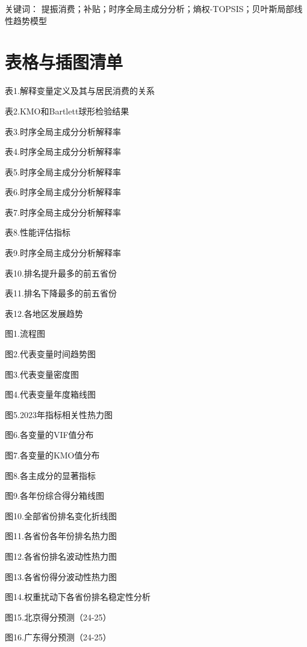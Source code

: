 \documentclass[UTF8,a4paper,zihao=-4,AutoFakeBold]{ctexart}
\begin{document}
		
		
		\heiti{}\setlength{\baselineskip}{24pt}  关键词：
		\songti{}\setlength{\baselineskip}{24pt} 提振消费；补贴；时序全局主成分分析；熵权-TOPSIS；贝叶斯局部线性趋势模型
	
	\clearpage
	\tableofcontents
	\newpage
	\clearpage
	
	\clearpage
	\section*{\centering\heiti{} 表格与插图清单} 
	表1.解释变量定义及其与居民消费的关系
	
	表2.KMO和Bartlett球形检验结果
	
	表3.时序全局主成分分析解释率
	
	表4.时序全局主成分分析解释率
	
	表5.时序全局主成分分析解释率
	
	表6.时序全局主成分分析解释率
	
	表7.时序全局主成分分析解释率
	
	表8.性能评估指标
	
	表9.时序全局主成分分析解释率
	
	表10.排名提升最多的前五省份
	
	表11.排名下降最多的前五省份
	
	表12.各地区发展趋势
	
	图1.流程图
	
	图2.代表变量时间趋势图
	
	图3.代表变量密度图
	
	图4.代表变量年度箱线图
	
	图5.2023年指标相关性热力图
	
	图6.各变量的VIF值分布
	
	图7.各变量的KMO值分布
	
	图8.各主成分的显著指标
	
	图9.各年份综合得分箱线图
	
	图10.全部省份排名变化折线图
	
	图11.各省份各年份排名热力图
	
	图12.各省份排名波动性热力图
	
	图13.各省份得分波动性热力图
	
	图14.权重扰动下各省份排名稳定性分析
	
	图15.北京得分预测（24-25）
	
	图16.广东得分预测（24-25）
	
\end{document}
